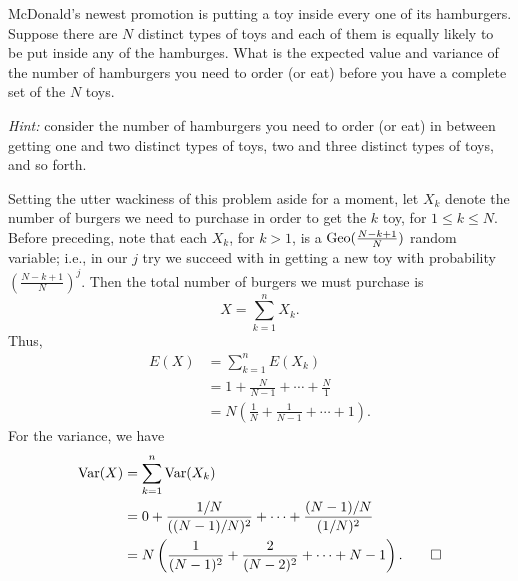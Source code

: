\begin{problem}
  McDonald's newest promotion is putting a toy inside every one of its
  hamburgers. Suppose there are \(N\) distinct types of toys and each of
  them is equally likely to be put inside any of the hamburges. What is the
  expected value and variance of the number of hamburgers you need to order
  (or eat) before you have a complete set of the \(N\) toys.

  \noindent\emph{Hint:} consider the number of hamburgers you need to order
  (or eat) in between getting one and two distinct types of toys, two and
  three distinct types of toys, and so forth.
\end{problem}
\begin{solution*}
  Setting the utter wackiness of this problem aside for a moment, let
  \(X_k\) denote the number of burgers we need to purchase in order to get
  the \(k\) toy, for \(1\leq k\leq N\). Before preceding, note
  that each \(X_k\), for \(k>1\), is a \(\operatorname{Geo}(\frac{N-k+1}{N})\) random
  variable; i.e., in our \(j\) try we succeed with in getting a
  new toy with probability \((\frac{N-k+1}{N})^j\). Then the total number
  of burgers we must purchase is
  \[
    X=\sum_{k=1}^n X_k.
  \]
  Thus,
  \begin{align*}
    E(X)
    &=\sum_{k=1}^n E(X_k)\\
    &=1+\frac{N}{N-1}+\dotsb+\frac{N}{1}\\
    &=N\left(\frac{1}{N}+\frac{1}{N-1}+\dotsb+1\right).
  \end{align*}
  For the variance, we have
  \begin{align*}
    \operatorname{Var}(X)
    &=\sum_{k=1}^n\operatorname{Var}(X_k)\\
    &=0+\frac{1/N}{((N-1)/N)^2}+\dotsb+\frac{(N-1)/N}{(1/N)^2}\\
    &=N\left(\frac{1}{(N-1)^2}+\frac{2}{(N-2)^2}+\dotsb+N-1\right).\qedhere
  \end{align*}
\end{solution*}

